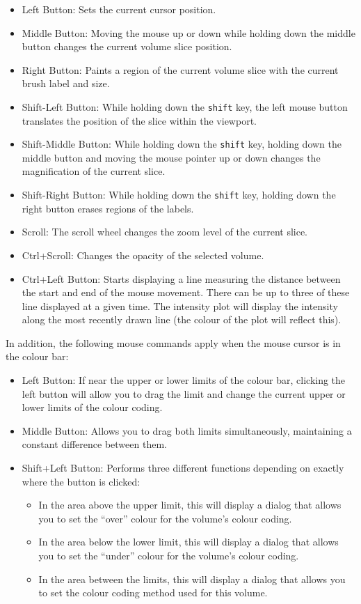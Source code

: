 \documentclass[11pt,letterpaper]{article}
\newcommand{\ident}[1]{{\tt #1}}
\begin{document}
\begin{itemize}
\item Left Button: Sets the current cursor position.
\item Middle Button: Moving the mouse up or down while holding down
  the middle button changes the current volume slice position.
\item Right Button: Paints a region of the current volume slice with the
current brush label and size.
\item Shift-Left Button: While holding down the \ident{shift} key, the
  left mouse button translates the position of the slice within the
  viewport.
\item Shift-Middle Button: While holding down the \ident{shift} key,
  holding down the middle button and moving the mouse pointer up or down
  changes the magnification of the current slice.
\item Shift-Right Button: While holding down the \ident{shift} key,
  holding down the right button erases regions of the labels.
\item Scroll: The scroll wheel changes the zoom level of the current slice.
\item Ctrl+Scroll: Changes the opacity of the selected volume.
\item Ctrl+Left Button: Starts displaying a line measuring the
 distance between the start and end of the mouse movement. There can be up to three of these line displayed at a given time. The intensity plot will display the intensity along the most recently drawn line (the colour of the plot will reflect this).
\end{itemize}

In addition, the following mouse commands apply when the mouse cursor is in the colour bar:
\begin{itemize}
\item Left Button: If near the upper or lower limits of the colour bar,
clicking the left button will allow you to drag the limit and change the
current upper or lower limits of the colour coding.
\item Middle Button: Allows you to drag both limits simultaneously, maintaining a 
constant difference between them.
\item Shift+Left Button: Performs three different functions depending on
exactly where the button is clicked:
\begin{itemize}
\item In the area above the upper limit,
 this will display a dialog that allows you to set the ``over'' colour
 for the volume's colour coding.
\item In the area below the lower limit,
 this will display a dialog that allows you to set the ``under'' colour
 for the volume's colour coding.
\item In the area between the limits, this will display a dialog that
allows you to set the colour coding method used for this volume.
\end{itemize}
\end{itemize}
\end{document}
